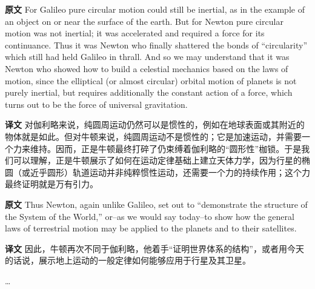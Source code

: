 \documentclass[UTF8,zihao=-4]{ctexart}
\begin{document}
\noindent\textbf{原文} For Galileo pure circular motion could still be inertial, as in the example of an object on or near the surface of the earth. But for Newton pure circular motion was not inertial; it was accelerated and required a force for its continuance. Thus it was Newton who finally shattered the bonds of ``circularity'' which still had held Galileo in thrall. And so we may understand that it was Newton who showed how to build a celestial mechanics based on the laws of motion, since the elliptical (or almost circular) orbital motion of planets is not purely inertial, but requires additionally the constant action of a force, which turns out to be the force of universal gravitation.
\par\noindent\textbf{译文} 对伽利略来说，纯圆周运动仍然可以是惯性的，例如在地球表面或其附近的物体就是如此。但对牛顿来说，纯圆周运动不是惯性的；它是加速运动，并需要一个力来维持。因而，正是牛顿最终打碎了仍束缚着伽利略的“圆形性”枷锁。于是我们可以理解，正是牛顿展示了如何在运动定律基础上建立天体力学，因为行星的椭圆（或近乎圆形）轨道运动并非纯粹惯性运动，还需要一个力的持续作用；这个力最终证明就是万有引力。
\medskip

\noindent\textbf{原文} Thus Newton, again unlike Galileo, set out to ``demonstrate the structure of the System of the World,'' or--as we would say today--to show how the general laws of terrestrial motion may be applied to the planets and to their satellites.
\par\noindent\textbf{译文} 因此，牛顿再次不同于伽利略，他着手“证明世界体系的结构”，或者用今天的话说，展示地上运动的一般定律如何能够应用于行星及其卫星。
\medskip

\begin{center}
\ldots
\end{center}
\end{document}
